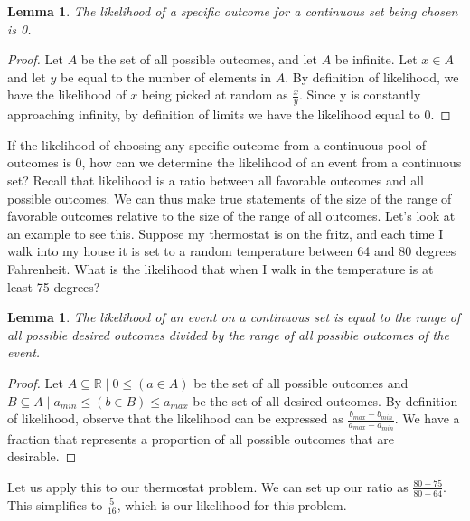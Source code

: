 \documentclass{article}
\newtheorem{lemma}[theorem]{Lemma}
\begin{document}
\begin{lemma}
    The likelihood of a specific outcome for a continuous set being chosen is 0.
\end{lemma}

\begin{proof}
    Let $A$ be the set of all possible outcomes, and let $A$ be infinite. Let $x\in A$ and let $y$ be equal to the number of elements in $A$. By definition of likelihood, we have the likelihood of $x$ being picked at random as $\frac{x}{y}$. Since y is constantly approaching infinity, by definition of limits we have the likelihood equal to 0.
\end{proof}

If the likelihood of choosing any specific outcome from a continuous pool of outcomes is 0, how can we determine the likelihood of an event from a continuous set? Recall that likelihood is a ratio between all favorable outcomes and all possible outcomes. We can thus make true statements of the size of the range of favorable outcomes relative to the size of the range of all outcomes. Let's look at an example to see this. Suppose my thermostat is on the fritz, and each time I walk into my house it is set to a random temperature between 64 and 80 degrees Fahrenheit. What is the likelihood that when I walk in the temperature is at least 75 degrees?

\begin{lemma}
    The likelihood of an event on a continuous set is equal to the range of all possible desired outcomes divided by the range of all possible outcomes of the event.
\end{lemma}

\begin{proof}
    Let $A\subseteq\mathbb{R}\mid 0\leq (a\in A)$ be the set of all possible outcomes and $B\subseteq A\mid a_{min}\leq (b\in B)\leq a_{max}$ be the set of all desired outcomes. By definition of likelihood, observe that the likelihood can be expressed as $\frac{b_{max}-b_{min}}{a_{max}-a_{min}}$. We have a fraction that represents a proportion of all possible outcomes that are desirable.
\end{proof}

Let us apply this to our thermostat problem. We can set up our ratio as $\frac{80-75}{80-64}$. This simplifies to $\frac{5}{16}$, which is our likelihood for this problem.
\end{document}
